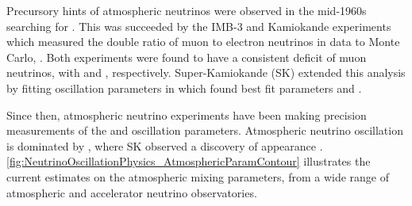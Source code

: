 Precursory hints of atmospheric neutrinos were observed in the mid-1960s searching for  \cite{Reines1965-cf}.
This was succeeded by the IMB-3 \cite{PhysRevLett.66.2561} and Kamiokande \cite{Hirata1992-qz} experiments which measured the double ratio of muon to electron neutrinos in data to Monte Carlo, . Both experiments were found to have a consistent deficit of muon neutrinos, with  and , respectively. %
Super-Kamiokande (SK) \cite{Ashie_2005} extended this analysis by fitting oscillation parameters in  which found best fit parameters  and .

Since then, atmospheric neutrino experiments have been making precision measurements of the  and  oscillation parameters.
Atmospheric neutrino oscillation is dominated by , where SK observed a \quickmath{4.6\sigma} discovery of \quickmath{\nu_{\tau}} appearance \cite{Li_2018}. \autoref{fig:NeutrinoOscillationPhysics_AtmosphericParamContour} illustrates the current estimates on the atmospheric mixing parameters, from a wide range of atmospheric and accelerator neutrino observatories.

